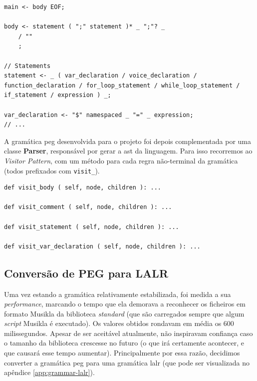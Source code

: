 \begin{lstlisting}[caption={Excerto da gramática PEG, bem como da sintaxe usada para a descrever}]
main <- body EOF;

body <- statement ( ";" statement )* _ ";"? _
    / ""
    ;

// Statements
statement <- _ ( var_declaration / voice_declaration / function_declaration / for_loop_statement / while_loop_statement / if_statement / expression ) _;

var_declaration <- "$" namespaced _ "=" _ expression;
// ...
\end{lstlisting}

A gramática \acrshort{peg} desenvolvida para o projeto foi depois complementada por uma classe \textbf{Parser}, responsável por gerar a \acrshort{ast} da linguagem. Para isso recorremos ao \textit{Visitor Pattern}, com um método para cada regra não-terminal da gramática (todos prefixados com \texttt{visit\_}).

\begin{lstlisting}[caption={Métodos responsáveis por criarem a AST}]
def visit_body ( self, node, children ): ...

def visit_comment ( self, node, children ): ...

def visit_statement ( self, node, children ): ...

def visit_var_declaration ( self, node, children ): ...
\end{lstlisting}

\subsection{Conversão de PEG para LALR}
Uma vez estando a gramática relativamente estabilizada, foi medida a sua \textit{performance}, marcando o tempo que ela demorava a reconhecer os ficheiros em formato Musikla da biblioteca \textit{standard} (que são carregados sempre que algum \textit{script} Musikla é executado). Os valores obtidos rondavam em média os 600 milissegundos. Apesar de ser aceitável atualmente, não inspiravam confiança caso o tamanho da biblioteca crescesse no futuro (o que irá certamente acontecer, e que causará esse tempo aumentar). Principalmente por essa razão, decidimos converter a gramática \acrshort{peg} para uma gramática \acrfull{lalr} (que pode ser visualizada no apêndice \ref{app:grammar-lalr}).

